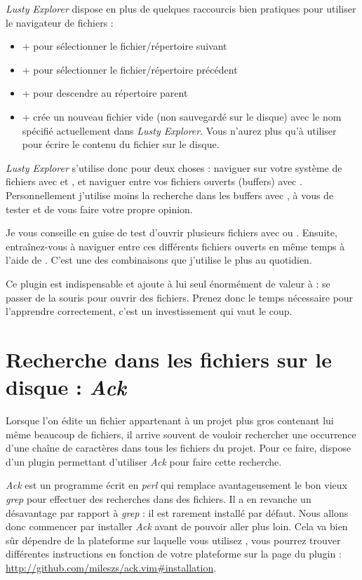 \emph{Lusty Explorer} dispose en plus de quelques raccourcis bien pratiques pour utiliser le navigateur de fichiers :

\begin{itemize}
    \item \tctrl + \tn\xspace pour sélectionner le fichier/répertoire suivant
    \item \tctrl + \tp pour sélectionner le fichier/répertoire précédent
    \item \tctrl + \tw pour descendre au répertoire parent
    \item \tctrl + \te crée un nouveau fichier vide (non sauvegardé sur le disque) avec le nom spécifié actuellement dans \emph{Lusty Explorer}. Vous n'aurez plus qu'à utiliser  pour écrire le contenu du fichier sur le disque.
\end{itemize}

\emph{Lusty Explorer} s'utilise donc pour deux choses : naviguer sur votre système de fichiers avec  et , et naviguer entre vos fichiers ouverts (buffers) avec . Personnellement j'utilise moins la recherche dans les buffers avec , à vous de tester et de vous faire votre propre opinion.

Je vous conseille en guise de test d'ouvrir plusieurs fichiers avec  ou . Ensuite, entraînez-vous à naviguer entre ces différents fichiers ouverts en même temps à l'aide de . C'est une des combinaisons que j'utilise le plus au quotidien.

Ce plugin est indispensable et ajoute à lui seul énormément de valeur à \vim : se passer de la souris pour ouvrir des fichiers. Prenez donc le temps nécessaire pour l'apprendre correctement, c'est un investissement qui vaut le coup.

\section{Recherche dans les fichiers sur le disque : \emph{Ack}}

Lorsque l'on édite un fichier appartenant à un projet plus gros contenant lui même beaucoup de fichiers, il arrive souvent de vouloir rechercher une occurrence d'une chaîne de caractères dans tous les fichiers du projet. Pour ce faire, \vim dispose d'un plugin permettant d'utiliser \emph{Ack} pour faire cette recherche.

\emph{Ack} est un programme écrit en \emph{perl} qui remplace avantageusement le bon vieux \emph{grep} pour effectuer des recherches dans des fichiers. Il a en revanche un désavantage par rapport à \emph{grep} : il est rarement installé par défaut. Nous allons donc commencer par installer \emph{Ack} avant de pouvoir aller plus loin. Cela va bien sûr dépendre de la plateforme sur laquelle vous utilisez \vim, vous pourrez trouver différentes instructions en fonction de votre plateforme sur la page du plugin : \url{http://github.com/mileszs/ack.vim#installation}.

